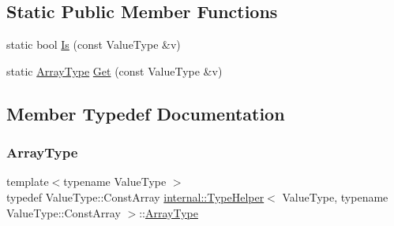 \subsection*{Static Public Member Functions}
\begin{DoxyCompactItemize}
\item 
static bool \hyperlink{structinternal_1_1TypeHelper_3_01ValueType_00_01typename_01ValueType_1_1ConstArray_01_4_a259497292f89c58789b1e947249dd299}{Is} (const Value\+Type \&v)
\item 
static \hyperlink{structinternal_1_1TypeHelper_3_01ValueType_00_01typename_01ValueType_1_1ConstArray_01_4_a88c3a7bbff09fdd44ce6980f8122ba05}{Array\+Type} \hyperlink{structinternal_1_1TypeHelper_3_01ValueType_00_01typename_01ValueType_1_1ConstArray_01_4_a247811db25d6f25cc63175e03d847b8b}{Get} (const Value\+Type \&v)
\end{DoxyCompactItemize}


\subsection{Member Typedef Documentation}
\mbox{\label{structinternal_1_1TypeHelper_3_01ValueType_00_01typename_01ValueType_1_1ConstArray_01_4_a88c3a7bbff09fdd44ce6980f8122ba05}} 
\subsubsection{\texorpdfstring{Array\+Type}{ArrayType}}
{\footnotesize\ttfamily template$<$typename Value\+Type $>$ \\
typedef Value\+Type\+::\+Const\+Array \hyperlink{structinternal_1_1TypeHelper}{internal\+::\+Type\+Helper}$<$ Value\+Type, typename Value\+Type\+::\+Const\+Array $>$\+::\hyperlink{structinternal_1_1TypeHelper_3_01ValueType_00_01typename_01ValueType_1_1ConstArray_01_4_a88c3a7bbff09fdd44ce6980f8122ba05}{Array\+Type}}



